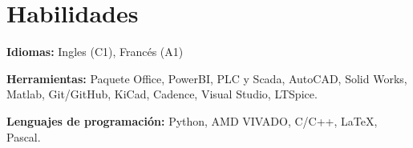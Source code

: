 \section{Habilidades}
 \begin{itemize}[leftmargin=0.15in, label={}]
    \small{\item{
    
    \textbf{Idiomas: }{Ingles (C1), Francés (A1)} \\
    \medskip
    
    \textbf{Herramientas: }{Paquete Office, PowerBI, PLC y Scada, AutoCAD, Solid Works, Matlab, Git/GitHub, KiCad, Cadence, Visual Studio, LTSpice.}\\
    \medskip 

    \textbf{Lenguajes de programación: }{Python, AMD VIVADO, C/C++, \LaTeX, Pascal.} \\
    \medskip
     
     

     }
     }
 \end{itemize}